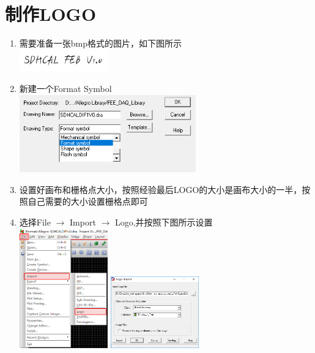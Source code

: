 \documentclass[color=green,mathpazo,titlestyle=hang,11pt]{elegantbook}
\begin{document}
\section{制作LOGO}
	\begin{enumerate}
		\item 需要准备一张bmp格式的图片，如下图所示 \\ \includegraphics[width=0.3\textwidth]{figures/SDHCALFEB1V0.png}
		\item 新建一个Format Symbol \\ \includegraphics[width=0.6\textwidth]{figures/CreateFormatSymbol.png}
		\item 设置好画布和栅格点大小，按照经验最后LOGO的大小是画布大小的一半，按照自己需要的大小设置栅格点即可
		\item 选择File $\rightarrow$ Import $\rightarrow$ Logo,并按照下图所示设置 \\ \includegraphics[width= 0.3\textwidth]{figures/FileImportLogo.png} \includegraphics[width=0.3\textwidth]{figures/LogoImport.png}

\end{enumerate}
\end{document}

